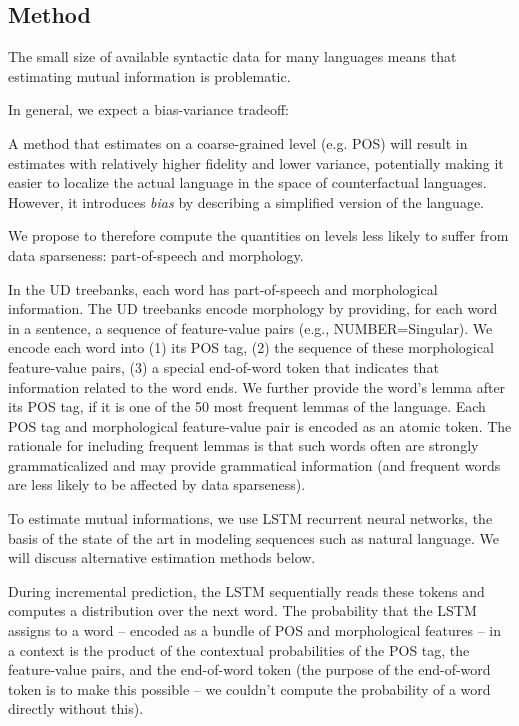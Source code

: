 \documentclass[11pt,letterpaper]{article}
\begin{document}
\subsection{Method}
The small size of available syntactic data for many languages means that estimating mutual information is problematic.


In general, we expect a bias-variance tradeoff:

A method that estimates on a coarse-grained level (e.g. POS) will result in estimates with relatively higher fidelity and lower variance, potentially making it easier to localize the actual language in the space of counterfactual languages.
However, it introduces \emph{bias} by describing a simplified version of the language.





We propose to therefore compute the quantities on levels less likely to suffer from data sparseness: part-of-speech and morphology.

In the UD treebanks, each word has part-of-speech and morphological information.
The UD treebanks encode morphology by providing, for each word in a sentence, a sequence of feature-value pairs (e.g., NUMBER=Singular).
We encode each word into (1) its POS tag, (2) the sequence of these morphological feature-value pairs, (3) a special end-of-word token that indicates that information related to the word ends.
We further provide the word's lemma after its POS tag, if it is one of the 50 most frequent lemmas of the language.
Each POS tag and morphological feature-value pair is encoded as an atomic token.
The rationale for including frequent lemmas is that such words often are strongly grammaticalized and may provide grammatical information (and frequent words are less likely to be affected by data sparseness).


To estimate mutual informations, we use LSTM recurrent neural networks, the basis of the state of the art in modeling sequences such as natural language.
We will discuss alternative estimation methods below.

During incremental prediction, the LSTM sequentially reads these tokens and computes a distribution over the next word.
The probability that the LSTM assigns to a word -- encoded as a bundle of POS and morphological features -- in a context is the product of the contextual probabilities of the POS tag, the feature-value pairs, and the end-of-word token (the purpose of the end-of-word token is to make this possible -- we couldn't compute the probability of a word directly without this).
\end{document}
